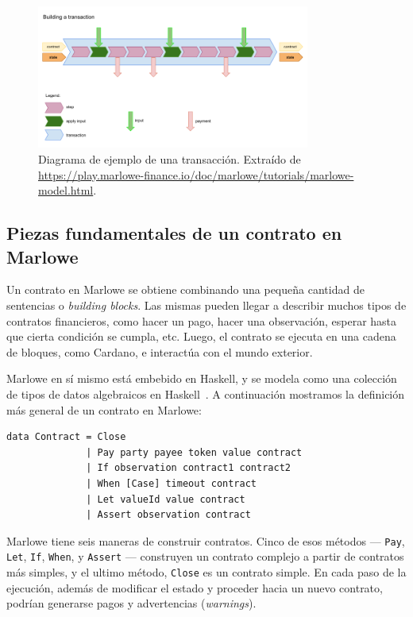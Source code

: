 \documentclass[12pt]{book}
\begin{document}
\begin{figure}[H]
    \centering
    \includegraphics[width=0.8\textwidth]{Transaccion.png}
    \caption{Diagrama de ejemplo de una transacción. Extraído de \url{https://play.marlowe-finance.io/doc/marlowe/tutorials/marlowe-model.html}.}\label{fig:Transaccion}
\end{figure}


\subsection{Piezas fundamentales de un contrato en Marlowe}\label{sec:constructores_marlowe}
Un contrato en Marlowe se obtiene combinando una pequeña cantidad de sentencias o \textit{building blocks}. Las mismas pueden llegar a describir muchos tipos de contratos financieros, como hacer un pago, hacer una observación, esperar hasta que cierta condición se cumpla, etc. Luego, el contrato se ejecuta en una cadena de bloques, como Cardano, e interactúa con el mundo exterior.

Marlowe en sí mismo está embebido en Haskell, y se modela como una colección de tipos de datos algebraicos en Haskell~\cite{Algebraic_data_type}. A continuación mostramos la definición más general de un contrato en Marlowe:

\begin{lstlisting}[style=Haskell-cardano, language=Marlowe, caption=Tipos de contratos en Marlowe.]
data Contract = Close
              | Pay party payee token value contract
              | If observation contract1 contract2
              | When [Case] timeout contract
              | Let valueId value contract
              | Assert observation contract
\end{lstlisting}

Marlowe tiene seis maneras de construir contratos. Cinco de esos métodos ---
\texttt{Pay}, \texttt{Let}, \texttt{If}, \texttt{When}, y \texttt{Assert} --- construyen un contrato complejo a partir de contratos más simples, y el ultimo método, \texttt{Close} es un contrato simple. En cada paso de la ejecución, además de modificar el estado y proceder hacia un nuevo contrato, podrían generarse pagos y advertencias (\textit{warnings}).
\end{document}
